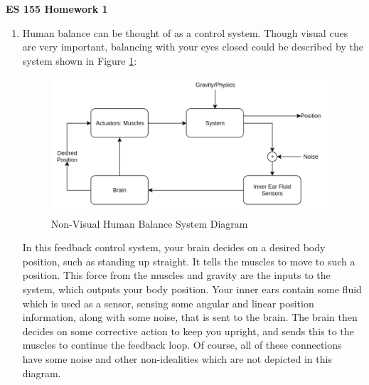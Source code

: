 \documentclass[11pt]{article}
\theoremstyle{definition}
\begin{document}
\textbf{\huge{ES 155 Homework 1}}    %
\normalsize

\begin{enumerate}
    \item %
    Human balance can be thought of as a control system.  Though visual cues are very important, balancing with your eyes closed could be described by the system shown in Figure \ref{fig:humanbalance}:
    
    \begin{figure}[h]
        \centering
        \includegraphics[width = 0.8 \textwidth]{ES155P1_1_balancediagram.png}
        \caption{Non-Visual Human Balance System Diagram}
        \label{fig:humanbalance}
    \end{figure}
    
    In this feedback control system, your brain decides on a desired body position, such as standing up straight.  It tells the muscles to move to such a position.  This force from the muscles and gravity are the inputs to the system, which outputs your body position.  Your inner ears contain some fluid which is used as a sensor, sensing some angular and linear position information, along with some noise, that is sent to the brain.  The brain then decides on some corrective action to keep you upright, and sends this to the muscles to continue the feedback loop.  Of course, all of these connections have some noise and other non-idealities which are not depicted in this diagram.
    

\end{enumerate}
\end{document}
